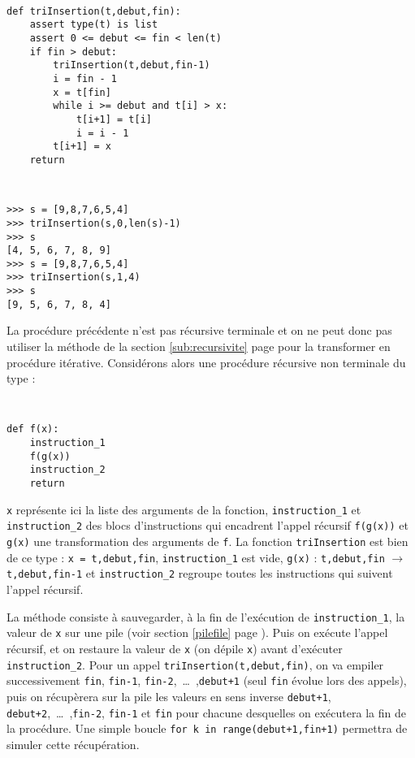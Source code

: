 \noindent\mbox{}\hspace*{1cm}\begin{py}{8cm}\tt
\begin{verbatim}
def triInsertion(t,debut,fin):
    assert type(t) is list
    assert 0 <= debut <= fin < len(t)
    if fin > debut:
        triInsertion(t,debut,fin-1)
        i = fin - 1
        x = t[fin]
        while i >= debut and t[i] > x:
            t[i+1] = t[i]
            i = i - 1
        t[i+1] = x
    return
\end{verbatim}
\end{py}
\hfill
\begin{py}{7cm}\tt
\begin{verbatim}
>>> s = [9,8,7,6,5,4]
>>> triInsertion(s,0,len(s)-1)
>>> s
[4, 5, 6, 7, 8, 9]
>>> s = [9,8,7,6,5,4]
>>> triInsertion(s,1,4)
>>> s
[9, 5, 6, 7, 8, 4]
\end{verbatim}
\end{py}

\vspace*{2mm}

La procédure précédente n'est pas récursive terminale et on ne peut donc pas utiliser
la méthode de la section \ref{sub:recursivite} page \pageref{methode:recursivite}
pour la transformer en procédure itérative.
Considérons alors une procédure récursive non terminale du type :

\noindent\mbox{}\hspace*{1cm}\begin{py}{4cm}\tt
\begin{verbatim}
def f(x):
    instruction_1
    f(g(x))
    instruction_2
    return
\end{verbatim}
\end{py}
\hfill
\begin{py}{11cm}
{\tt x} représente ici la liste des arguments de la fonction,
{\tt instruction\_1} et {\tt instruction\_2} des blocs d'instructions qui encadrent
l'appel récursif {\tt f(g(x))} et  
{\tt g(x)} une transformation des arguments de {\tt f}.
La fonction {\tt triInsertion} est bien de ce type :
{\tt x = t,debut,fin}, {\tt instruction\_1} est vide, {\tt g(x)} : {\tt t,debut,fin}
$\rightarrow$ {\tt t,debut,fin-1} et {\tt instruction\_2} regroupe toutes les instructions
qui suivent l'appel récursif.
\end{py}

\vspace*{2mm}


La méthode consiste à sauvegarder, à la fin de l'exécution de {\tt instruction\_1},
la valeur de {\tt x} sur une pile (voir section \ref{pilefile} page \pageref{pilefile}). 
Puis on exécute l'appel récursif, et on restaure la valeur de {\tt x} (on dépile {\tt x}) 
avant d'exécuter {\tt instruction\_2}.\label{recursivite:pile}
Pour un appel {\tt triInsertion(t,debut,fin)}, on va empiler successivement
{\tt fin}, {\tt fin-1}, {\tt fin-2},\ \ldots\ ,{\tt debut+1} 
(seul {\tt fin} évolue lors des appels), puis on récupèrera sur la pile les
valeurs en sens inverse {\tt debut+1}, {\tt debut+2},\ \ldots\ ,{\tt fin-2}, {\tt fin-1} et 
{\tt fin} pour chacune desquelles on exécutera la fin de la procédure. 
Une simple boucle {\tt for k in range(debut+1,fin+1)} permettra de simuler cette récupération.

